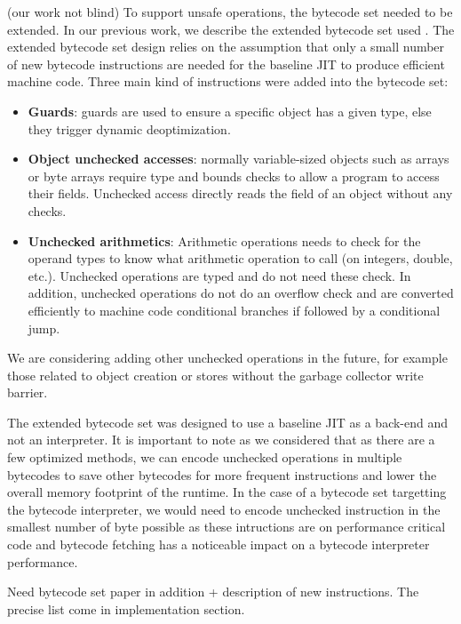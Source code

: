 \documentclass[a4paper,12pt,twoside]{../includes/ThesisStyle}
\begin{document}
(our work not blind)
To support unsafe operations, the bytecode set needed to be extended. In our previous work, we describe the extended bytecode set used \cite{Bera14a}. The extended bytecode set design relies on the assumption that only a small number of new bytecode instructions are needed for the baseline JIT to produce efficient machine code. Three main kind of instructions were added into the bytecode set:
\begin{itemize}
\item \textbf{Guards}: guards are used to ensure a specific object has a given type, else they trigger dynamic deoptimization.
\item \textbf{Object unchecked accesses}: normally variable-sized objects such as arrays or byte arrays require type and bounds checks to allow a program to access their fields. Unchecked access directly reads the field of an object without any checks.
\item \textbf{Unchecked arithmetics}: Arithmetic operations needs to check for the operand types to know what arithmetic operation to call (on integers, double, etc.). Unchecked operations are typed and do not need these check. In addition, unchecked operations do not do an overflow check and are converted efficiently to machine code conditional branches if followed by a conditional jump.
\end{itemize}

We are considering adding other unchecked operations in the future, for example those related to object creation or stores without the garbage collector write barrier.

The extended bytecode set was designed to use a baseline JIT as a back-end and not an interpreter. It is important to note as we considered that as there are a few optimized methods, we can encode unchecked operations in multiple bytecodes to save other bytecodes for more frequent instructions and lower the overall memory footprint of the runtime. In the case of a bytecode set targetting the bytecode interpreter, we would need to encode unchecked instruction in the smallest number of byte possible as these intructions are on performance critical code and bytecode fetching has a noticeable impact on a bytecode interpreter performance.


Need bytecode set paper in addition + description of new instructions. The precise list come in implementation section.


\ifx\wholebook\relax\else
    
\end{document}
